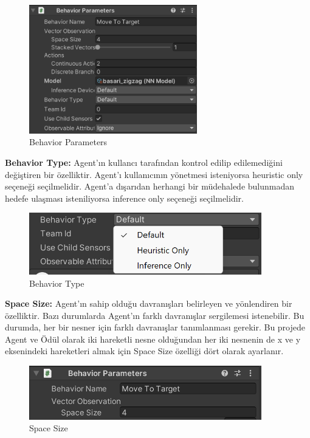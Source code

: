 \documentclass{article}
\begin{document}
\begin{figure}[h]
  \centering
  \includegraphics[width=0.65\textwidth]{behavior.png}
  \caption{Behavior Parameters}
\end{figure}

\par\textbf{Behavior Type:} Agent'ın kullancı tarafından kontrol edilip edilemediğini değiştiren bir özelliktir. Agent'ı kullanıcının  yönetmesi isteniyorsa heuristic only seçeneği seçilmelidir. Agent'a dışarıdan herhangi bir müdehalede bulunmadan hedefe ulaşması isteniliyorsa inference only seçeneği seçilmelidir.
    \newline

\begin{figure}[h]
  \centering
  \includegraphics[width=0.9\textwidth]{behavior_type.png}
  \caption{Behavior Type}
\end{figure}

\vspace{1cm}

\par\textbf{Space Size:} Agent'ın sahip olduğu davranışları belirleyen ve yönlendiren bir özelliktir. Bazı durumlarda Agent'ın farklı davranışlar sergilemesi istenebilir. Bu durumda, her bir nesner için farklı davranışlar tanımlanması gerekir. Bu projede Agent ve Ödül olarak iki hareketli nesne olduğundan her iki nesnenin de x ve y eksenindeki hareketleri almak için Space Size özelliği dört olarak ayarlanır.
    \newline

\begin{figure}[h]
  \centering
  \includegraphics[width=0.9\textwidth]{space_size.png}
  \caption{Space Size}
\end{figure}
\end{document}
